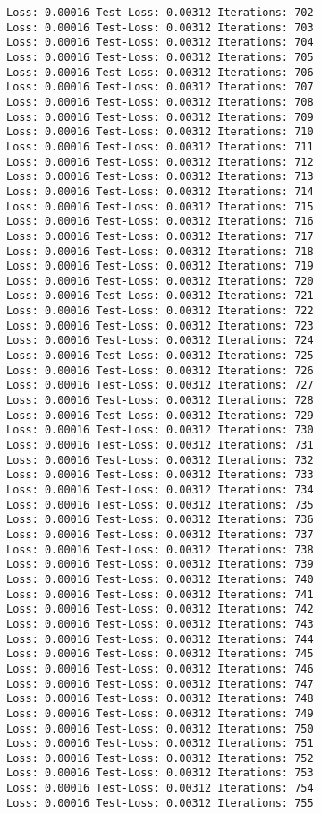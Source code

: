 \documentclass[11pt]{article}
\begin{document}
\begin{Verbatim}[commandchars=\\\{\}]
Loss: 0.00016 Test-Loss: 0.00312 Iterations: 702
Loss: 0.00016 Test-Loss: 0.00312 Iterations: 703
Loss: 0.00016 Test-Loss: 0.00312 Iterations: 704
Loss: 0.00016 Test-Loss: 0.00312 Iterations: 705
Loss: 0.00016 Test-Loss: 0.00312 Iterations: 706
Loss: 0.00016 Test-Loss: 0.00312 Iterations: 707
Loss: 0.00016 Test-Loss: 0.00312 Iterations: 708
Loss: 0.00016 Test-Loss: 0.00312 Iterations: 709
Loss: 0.00016 Test-Loss: 0.00312 Iterations: 710
Loss: 0.00016 Test-Loss: 0.00312 Iterations: 711
Loss: 0.00016 Test-Loss: 0.00312 Iterations: 712
Loss: 0.00016 Test-Loss: 0.00312 Iterations: 713
Loss: 0.00016 Test-Loss: 0.00312 Iterations: 714
Loss: 0.00016 Test-Loss: 0.00312 Iterations: 715
Loss: 0.00016 Test-Loss: 0.00312 Iterations: 716
Loss: 0.00016 Test-Loss: 0.00312 Iterations: 717
Loss: 0.00016 Test-Loss: 0.00312 Iterations: 718
Loss: 0.00016 Test-Loss: 0.00312 Iterations: 719
Loss: 0.00016 Test-Loss: 0.00312 Iterations: 720
Loss: 0.00016 Test-Loss: 0.00312 Iterations: 721
Loss: 0.00016 Test-Loss: 0.00312 Iterations: 722
Loss: 0.00016 Test-Loss: 0.00312 Iterations: 723
Loss: 0.00016 Test-Loss: 0.00312 Iterations: 724
Loss: 0.00016 Test-Loss: 0.00312 Iterations: 725
Loss: 0.00016 Test-Loss: 0.00312 Iterations: 726
Loss: 0.00016 Test-Loss: 0.00312 Iterations: 727
Loss: 0.00016 Test-Loss: 0.00312 Iterations: 728
Loss: 0.00016 Test-Loss: 0.00312 Iterations: 729
Loss: 0.00016 Test-Loss: 0.00312 Iterations: 730
Loss: 0.00016 Test-Loss: 0.00312 Iterations: 731
Loss: 0.00016 Test-Loss: 0.00312 Iterations: 732
Loss: 0.00016 Test-Loss: 0.00312 Iterations: 733
Loss: 0.00016 Test-Loss: 0.00312 Iterations: 734
Loss: 0.00016 Test-Loss: 0.00312 Iterations: 735
Loss: 0.00016 Test-Loss: 0.00312 Iterations: 736
Loss: 0.00016 Test-Loss: 0.00312 Iterations: 737
Loss: 0.00016 Test-Loss: 0.00312 Iterations: 738
Loss: 0.00016 Test-Loss: 0.00312 Iterations: 739
Loss: 0.00016 Test-Loss: 0.00312 Iterations: 740
Loss: 0.00016 Test-Loss: 0.00312 Iterations: 741
Loss: 0.00016 Test-Loss: 0.00312 Iterations: 742
Loss: 0.00016 Test-Loss: 0.00312 Iterations: 743
Loss: 0.00016 Test-Loss: 0.00312 Iterations: 744
Loss: 0.00016 Test-Loss: 0.00312 Iterations: 745
Loss: 0.00016 Test-Loss: 0.00312 Iterations: 746
Loss: 0.00016 Test-Loss: 0.00312 Iterations: 747
Loss: 0.00016 Test-Loss: 0.00312 Iterations: 748
Loss: 0.00016 Test-Loss: 0.00312 Iterations: 749
Loss: 0.00016 Test-Loss: 0.00312 Iterations: 750
Loss: 0.00016 Test-Loss: 0.00312 Iterations: 751
Loss: 0.00016 Test-Loss: 0.00312 Iterations: 752
Loss: 0.00016 Test-Loss: 0.00312 Iterations: 753
Loss: 0.00016 Test-Loss: 0.00312 Iterations: 754
Loss: 0.00016 Test-Loss: 0.00312 Iterations: 755

\end{Verbatim}
\end{document}
